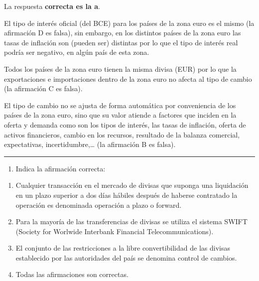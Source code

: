 \documentclass[
  letterpaper,
  DIV=11,
  numbers=noendperiod]{scrreprt}
\providecommand{\tightlist}{%
  \setlength{\itemsep}{0pt}\setlength{\parskip}{0pt}}\usepackage{longtable,booktabs,array}
\begin{document}
\begin{tcolorbox}[enhanced jigsaw, left=2mm, opacityback=0, colback=white, breakable, arc=.35mm, bottomrule=.15mm, rightrule=.15mm, toprule=.15mm, leftrule=.75mm, colframe=quarto-callout-tip-color-frame]
\begin{minipage}[t]{5.5mm}
\textcolor{quarto-callout-tip-color}{\faLightbulb}
\end{minipage}%
\begin{minipage}[t]{\textwidth - 5.5mm}

La respuesta \textbf{correcta es la a}.

El tipo de interés oficial (del BCE) para los países de la zona euro es
el mismo (la afirmación D es falsa), sin embargo, en los distintos
países de la zona euro las tasas de inflación son (pueden ser) distintas
por lo que el tipo de interés real podría ser negativo, en algún país de
esta zona.

Todos los países de la zona euro tienen la misma divisa (EUR) por lo que
la exportaciones e importaciones dentro de la zona euro no afecta al
tipo de cambio (la afirmación C es falsa).

El tipo de cambio no se ajusta de forma automática por conveniencia de
los países de la zona euro, sino que su valor atiende a factores que
inciden en la oferta y demanda como son los tipos de interés, las tasas
de inflación, oferta de activos financieros, cambio en los recursos,
resultado de la balanza comercial, expectativas, incertidumbre,\ldots{}
(la afirmación B es falsa).

\end{minipage}%
\end{tcolorbox}

\begin{center}\rule{0.5\linewidth}{0.5pt}\end{center}

\begin{enumerate}
\def\labelenumi{\arabic{enumi}.}
\setcounter{enumi}{32}
\tightlist
\item
  Indica la afirmación correcta:
\end{enumerate}

\begin{enumerate}
\def\labelenumi{\alph{enumi}.}
\item
  Cualquier transacción en el mercado de divisas que suponga una
  liquidación en un plazo superior a dos días hábiles después de haberse
  contratado la operación es denominada operación a plazo o forward.
\item
  Para la mayoría de las transferencias de divisas se utiliza el sistema
  SWIFT (Society for Worlwide Interbank Financial Telecommunications).
\item
  El conjunto de las restricciones a la libre convertibilidad de las
  divisas establecido por las autoridades del país se denomina control
  de cambios.
\item
  Todas las afirmaciones son correctas.
\end{enumerate}
\end{document}
